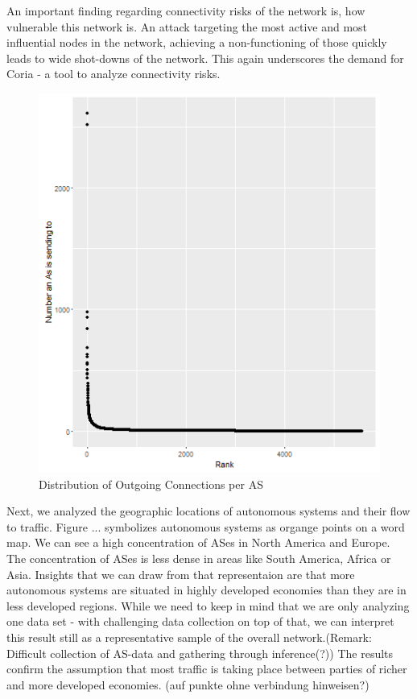 \documentclass[conference]{IEEEtran}
\begin{document}
An important finding regarding connectivity risks of the network is, how vulnerable this network is. An attack targeting the most active and most influential nodes in the network, achieving a non-functioning of those quickly leads to wide shot-downs of the network.  This again underscores the demand for Coria - a tool to analyze connectivity risks. 


\begin{figure}[htbp]
\centerline{\includegraphics[scale=0.4]{Graphics/AsFromDistribution.png}}
\caption{Distribution of Outgoing Connections per AS}
\label{fig}
\end{figure}



Next, we analyzed the geographic locations of autonomous systems and their flow to traffic. Figure ... symbolizes autonomous systems as organge points on a word map. We can see a high concentration of ASes in North America and Europe. The concentration of ASes is less dense in areas like South America, Africa or Asia. Insights that we can draw from that representaion are that more autonomous systems are situated in highly developed economies  than they are in less developed regions. While we need to keep in mind that we are only analyzing one data set - with challenging data collection on top of that, we can interpret this result still as a representative sample of the overall network.(Remark: Difficult collection of AS-data and gathering through inference(?)) The results confirm the assumption that most traffic is taking place between parties of richer and more developed economies.  (auf punkte ohne verbindung hinweisen?)
\end{document}
